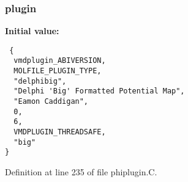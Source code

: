 \subsubsection{ plugin\hspace{0.3cm}{\tt  [static]}}\label{phiplugin_8C_a1}


{\bf Initial value:}

\footnotesize\begin{verbatim} {
  vmdplugin_ABIVERSION,   
  MOLFILE_PLUGIN_TYPE,    
  "delphibig",            
  "Delphi 'Big' Formatted Potential Map", 
  "Eamon Caddigan",       
  0,                      
  6,                      
  VMDPLUGIN_THREADSAFE,   
  "big"                   
}\end{verbatim}\normalsize 


Definition at line 235 of file phiplugin.C.